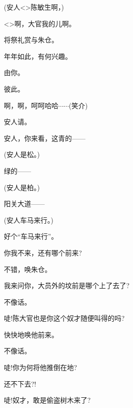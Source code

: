 {(安人\hspace{30pt}\textless{}\!\textgreater{}陈敏生啊，)

\textless{}\!\textgreater{}啊，大官我的儿啊。

\vspace{5pt}





将祭礼赏与朱仓。

年年如此，有何兴趣。

由你。

彼此。

啊，啊，呵呵哈哈$\cdots{}\cdots{}$({\hwfs 笑介})

安人请。

安人，你来看，这青的------

(安人\hspace{30pt}是松。)

绿的------

(安人\hspace{30pt}是柏。)

阳关大道------

(安人\hspace{30pt}车马来行。)

好个``车马来行''。

你我不来，还有哪个前来?

不错，唤朱仓。

我来问你，大员外的坟前是哪个上了去了?

不像话。

唗!陈大官也是你这个奴才随便叫得的吗?

快快地唤他前来。

不像话。

唗!你为何将他推倒在地?

还不下去?!

唗!奴才，敢是偷盗树木来了?

}
